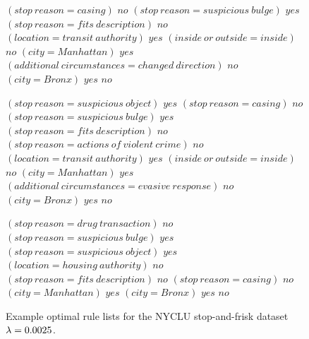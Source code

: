 \begin{figure}[h!]
\begin{algorithmic}
\State \belif $(stop~reason = casing)$ \bthen $no$
\State \belif $(stop~reason = suspicious~bulge)$ \bthen $yes$
\State \belif $(stop~reason = fits~description)$ \bthen $no$
\State \belif $(location = transit~authority)$ \bthen $yes$
\State \belif $(inside~or~outside = inside)$ \bthen $no$
\State \belif $(city = Manhattan)$ \bthen $yes$
\State \belif $(additional~circumstances = changed~direction)$ \bthen $no$
\State \belif $(city = Bronx)$ \bthen $yes$
\State \belse $no$
\end{algorithmic}
\vspace{0.5mm}
\begin{algorithmic}
\State \bif $(stop~reason = suspicious~object)$ \bthen $yes$ 
\State \belif $(stop~reason = casing)$ \bthen $no$
\State \belif $(stop~reason = suspicious~bulge)$ \bthen $yes$
\State \belif $(stop~reason = fits~description)$ \bthen $no$
\State \belif $(stop~reason = actions~of~violent~crime)$ \bthen $no$
\State \belif $(location = transit~authority)$ \bthen $yes$
\State \belif $(inside~or~outside = inside)$ \bthen $no$
\State \belif $(city = Manhattan)$ \bthen $yes$
\State \belif $(additional~circumstances = evasive~response)$ \bthen $no$
\State \belif $(city = Bronx)$ \bthen $yes$
\State \belse $no$
\end{algorithmic}
\vspace{0.5mm}
\begin{algorithmic}
\State \bif $(stop~reason = drug~transaction)$ \bthen $no$ 
\State \belif $(stop~reason = suspicious~bulge)$ \bthen $yes$
\State \belif $(stop~reason = suspicious~object)$ \bthen $yes$
\State \belif $(location = housing~authority)$ \bthen $no$
\State \belif $(stop~reason = fits~description)$ \bthen $no$
\State \belif $(stop~reason = casing)$ \bthen $no$
\State \belif $(city = Manhattan)$ \bthen $yes$
\State \belif $(city = Bronx)$ \bthen $yes$
\State \belse $no$
\end{algorithmic}
\caption{Example optimal rule lists for the NYCLU stop-and-frisk dataset~${{\lambda} = 0.0025}$.
}
\label{fig:weapon-rule-list-0025}
\end{figure}
